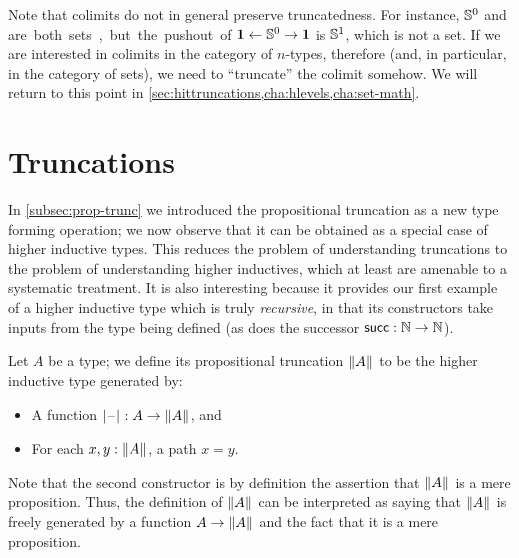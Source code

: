 \begin{rmk}
  Note that colimits do not in general preserve truncatedness.
  For instance, $\mathbb{S}^0$ and \unit are both sets, but the pushout of $\mathbf{1} \leftarrow \mathbb{S}^0 \to \mathbf{1}$ is $\mathbb{S}^1$, which is not a set.
  If we are interested in colimits in the category of $n$-types, therefore (and, in particular, in the category of sets), we need to ``truncate'' the colimit somehow.
  We will return to this point in \autoref{sec:hittruncations,cha:hlevels,cha:set-math}.
\end{rmk}


\section{Truncations}
\label{sec:hittruncations}

%
In \autoref{subsec:prop-trunc} we introduced the propositional truncation as a new type forming operation;
we now observe that it can be obtained as a special case of higher inductive types.
This reduces the problem of understanding truncations to the problem of understanding higher inductives, which at least are amenable to a systematic treatment.
It is also interesting because it provides our first example of a higher inductive type which is truly \emph{recursive}, in that its constructors take inputs from the type being defined (as does the successor $\mathsf{succ}:\mathbb{N}\to\mathbb{N}$).

Let $A$ be a type; we define its propositional truncation $\mathopen{}\left\Vert A\right\Vert_{}\mathclose{}$ to be the higher inductive type generated by:
\begin{itemize}
\item A function $|\mathord{\hspace{1pt}\text{--}\hspace{1pt}}|_{}^{} : A \to \mathopen{}\left\Vert A\right\Vert_{}\mathclose{}$, and
\item For each $x,y:\mathopen{}\left\Vert A\right\Vert_{}\mathclose{}$, a path $x=y$.
\end{itemize}
Note that the second constructor is by definition the assertion that $\mathopen{}\left\Vert A\right\Vert_{}\mathclose{}$ is a mere proposition.
Thus, the definition of $\mathopen{}\left\Vert A\right\Vert_{}\mathclose{}$ can be interpreted as saying that $\mathopen{}\left\Vert A\right\Vert_{}\mathclose{}$ is freely generated by a function $A\to\mathopen{}\left\Vert A\right\Vert_{}\mathclose{}$ and the fact that it is a mere proposition.

